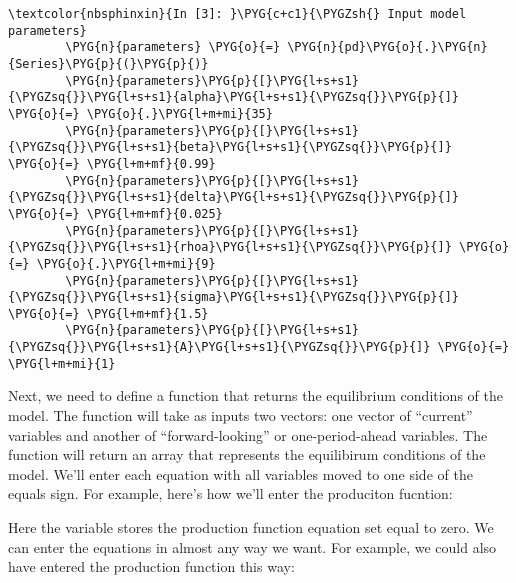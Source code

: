 \documentclass[letterpaper,10pt,openany,oneside,english]{sphinxmanual}
\begin{document}
\begin{Verbatim}[commandchars=\\\{\}]
\textcolor{nbsphinxin}{In [3]: }\PYG{c+c1}{\PYGZsh{} Input model parameters}
        \PYG{n}{parameters} \PYG{o}{=} \PYG{n}{pd}\PYG{o}{.}\PYG{n}{Series}\PYG{p}{(}\PYG{p}{)}
        \PYG{n}{parameters}\PYG{p}{[}\PYG{l+s+s1}{\PYGZsq{}}\PYG{l+s+s1}{alpha}\PYG{l+s+s1}{\PYGZsq{}}\PYG{p}{]}  \PYG{o}{=} \PYG{o}{.}\PYG{l+m+mi}{35}
        \PYG{n}{parameters}\PYG{p}{[}\PYG{l+s+s1}{\PYGZsq{}}\PYG{l+s+s1}{beta}\PYG{l+s+s1}{\PYGZsq{}}\PYG{p}{]}  \PYG{o}{=} \PYG{l+m+mf}{0.99}
        \PYG{n}{parameters}\PYG{p}{[}\PYG{l+s+s1}{\PYGZsq{}}\PYG{l+s+s1}{delta}\PYG{l+s+s1}{\PYGZsq{}}\PYG{p}{]}   \PYG{o}{=} \PYG{l+m+mf}{0.025}
        \PYG{n}{parameters}\PYG{p}{[}\PYG{l+s+s1}{\PYGZsq{}}\PYG{l+s+s1}{rhoa}\PYG{l+s+s1}{\PYGZsq{}}\PYG{p}{]} \PYG{o}{=} \PYG{o}{.}\PYG{l+m+mi}{9}
        \PYG{n}{parameters}\PYG{p}{[}\PYG{l+s+s1}{\PYGZsq{}}\PYG{l+s+s1}{sigma}\PYG{l+s+s1}{\PYGZsq{}}\PYG{p}{]} \PYG{o}{=} \PYG{l+m+mf}{1.5}
        \PYG{n}{parameters}\PYG{p}{[}\PYG{l+s+s1}{\PYGZsq{}}\PYG{l+s+s1}{A}\PYG{l+s+s1}{\PYGZsq{}}\PYG{p}{]} \PYG{o}{=} \PYG{l+m+mi}{1}
\end{Verbatim}

Next, we need to define a function that returns the equilibrium
conditions of the model. The function will take as inputs two vectors:
one vector of ``current'' variables and another of ``forward-looking'' or
one-period-ahead variables. The function will return an array that
represents the equilibirum conditions of the model. We'll enter each
equation with all variables moved to one side of the equals sign. For
example, here's how we'll enter the produciton fucntion:


Here the variable  stores the production function
equation set equal to zero. We can enter the equations in almost any way
we want. For example, we could also have entered the production function
this way:

\end{document}
